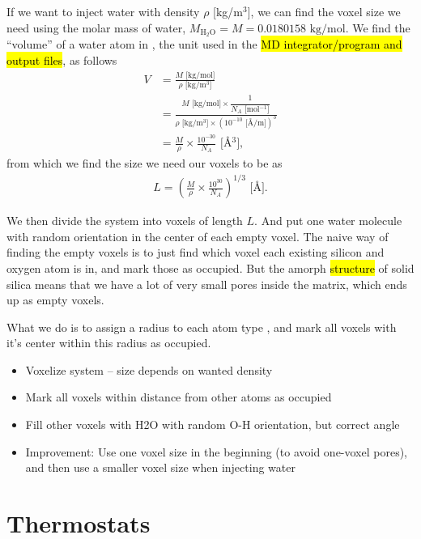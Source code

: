 If we want to inject water with density $\rho$ [kg/m$^3$], we can find the voxel size we need using the molar mass of water, $M_\text{H$_2$O} = M = 0.0180158 \text{ kg/mol}$. We find the ``volume'' of a water atom in \Ang, the unit used in the \hl{MD integrator/program and output files}, as follows
\begin{align*}
    V 
    &= \frac{ M\text{ [kg/mol]} }{ \rho\text{ [kg/m$^3$]} } \\
    &= \frac{
            M\text{ [kg/mol]} \times \dfrac{1}{N_A \text{ [mol$^{-1}$]}}
        }{
            \rho\text{ [kg/m$^3$]} \times \left(10^{-10} \text{ [\AA/m]}\right)^3
        } \\
    &= \frac{M}{\rho} \times \frac{10^{-30}}{N_A} \text{ [\AA$^3$]},
\end{align*}
from which we find the size we need our voxels to be as
\begin{align*}
    L = \left(\frac{M}{\rho} \times \frac{10^{30}}{N_A}\right)^{1/3}\text{ [\AA]}.
\end{align*}

We then divide the system into voxels of length $L$. And put one water molecule with random orientation in the center of each empty voxel. The naive way of finding the empty voxels is to just find which voxel each existing silicon and oxygen atom is in, and mark those as occupied. But the amorph \hl{structure} of solid silica means that we have a lot of very small pores inside the matrix, which ends up as empty voxels. 

What we do is to assign a radius to each atom type , and mark all voxels with it's center within this radius as occupied.

\begin{itemize}
    \item Voxelize system -- size depends on wanted density
    \item Mark all voxels within distance from other atoms as occupied
    \item Fill other voxels with H2O with random O-H orientation, but correct angle
    \item Improvement: Use one voxel size in the beginning (to avoid one-voxel pores), and then use a smaller voxel size when injecting water
\end{itemize}

\section{Thermostats}
